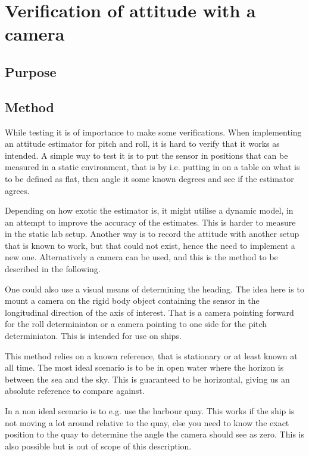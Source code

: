 \chapter{Verification of attitude with a camera}

\section{Purpose}
\section{Method}


While testing it is of importance to make some verifications. When implementing an attitude
estimator for pitch and roll, it is hard to verify that it works as
intended. A simple way to test it is to put the sensor in positions
that can be measured in a static environment, that is by i.e. putting
in on a table on what is to be defined as flat, then angle it
some known degrees and see if the estimator agrees.

Depending on how exotic the estimator is, it might utilise a dynamic
model, in an attempt to improve the accuracy of the estimates. This is
harder to measure in the static lab setup. Another way is to record
the attitude with another setup that is known to work, but that could
not exist, hence the need to implement a new one. Alternatively a
camera can be used, and this is the method to be described in the
following.

One could also use a visual means of determining the heading. The idea
here is to mount a camera on the rigid body object containing the
sensor in the longitudinal direction of the axis of interest. That is
a camera pointing forward for the roll determiniaton or a camera
pointing to one side for the pitch determiniaton. This is intended for
use on ships.

This method relies on a known reference, that is stationary or at least
known at all time. The most ideal scenario is to be in open water
where the horizon is between the sea and the sky. This is guaranteed
to be horizontal, giving us an absolute reference to compare against.

In a non ideal scenario is to e.g. use the harbour quay. This works if
the ship is not moving a lot around relative to the quay, else you
need to know the exact position to the quay to determine the angle the
camera should see as zero. This is also possible but is out of scope
of this description.

